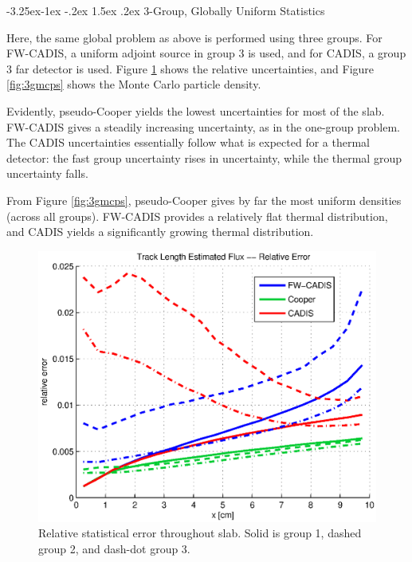 \documentclass[letter,11pt]{article}
\makeatletter
\renewcommand\subsection{\@startsection{subsection}{2}{\z@}%
                                {-3.25ex\@plus -1ex \@minus -.2ex}%
                                {1.5ex \@plus .2ex}%
                                {\normalfont\itshape\bf}}
\makeatother
\begin{document}
\subsection{3-Group, Globally Uniform Statistics}

Here, the same global problem as above is performed using three groups.  For FW-CADIS, a uniform adjoint source in group 3 is used, and for CADIS, a group 3 far detector is used.  Figure \ref{fig:3gstat} shows the relative uncertainties, and Figure \ref{fig:3gmcps} shows the Monte Carlo particle density.  

Evidently, pseudo-Cooper yields the lowest uncertainties for most of the slab.  FW-CADIS gives a steadily increasing uncertainty, as in the one-group problem.  The CADIS uncertainties essentially follow what is expected for a thermal detector: the fast group uncertainty rises in uncertainty, while the thermal group uncertainty falls.  

From Figure \ref{fig:3gmcps}, pseudo-Cooper gives by far the most uniform densities (across all groups).  FW-CADIS provides a relatively flat thermal distribution, and CADIS yields a significantly growing thermal distribution.

\begin{figure}[!] 
   \centering
   \includegraphics[keepaspectratio, width = 4.0 in]{3gstat}
   \caption{Relative statistical error throughout slab. Solid is group 1, dashed group 2, and dash-dot group 3.}
   \label{fig:3gstat}
\end{figure}
\end{document}

